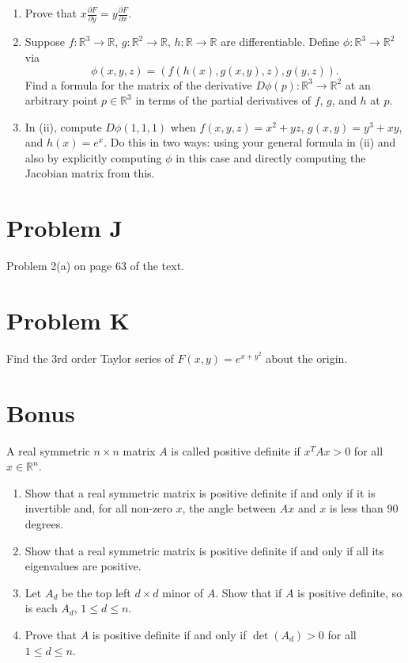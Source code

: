 \documentclass[lang=en,11pt]{template}
\begin{document}
\begin{enumerate}
    \item Prove that $x \frac{\partial F}{\partial y} = y \frac{\partial F}{\partial x}$.
    \item Suppose $f : \mathbb{R}^3 \to \mathbb{R}$, $g : \mathbb{R}^2 \to \mathbb{R}$, $h : \mathbb{R} \to \mathbb{R}$ are differentiable. Define $\phi : \mathbb{R}^3 \to \mathbb{R}^2$ via
    \[
    \phi(x, y, z) = (f(h(x), g(x, y), z), g(y, z)).
    \]
    Find a formula for the matrix of the derivative $D\phi(p) : \mathbb{R}^3 \to \mathbb{R}^2$ at an arbitrary point $p \in \mathbb{R}^3$ in terms of the partial derivatives of $f$, $g$, and $h$ at $p$.
    \item In (ii), compute $D\phi(1, 1, 1)$ when $f(x, y, z) = x^2 + yz$, $g(x, y) = y^3 + xy$, and $h(x) = e^x$. Do this in two ways: using your general formula in (ii) and also by explicitly computing $\phi$ in this case and directly computing the Jacobian matrix from this.
\end{enumerate}

\section*{Problem J}
Problem 2(a) on page 63 of the text.

\section*{Problem K}
Find the 3rd order Taylor series of $F(x, y) = e^{x + y^2}$ about the origin.

\section*{Bonus}
A real symmetric $n \times n$ matrix $A$ is called positive definite if $x^T A x > 0$ for all $x \in \mathbb{R}^n$.
\begin{enumerate}
    \item Show that a real symmetric matrix is positive definite if and only if it is invertible and, for all non-zero $x$, the angle between $Ax$ and $x$ is less than 90 degrees.
    \item Show that a real symmetric matrix is positive definite if and only if all its eigenvalues are positive.
    \item Let $A_d$ be the top left $d \times d$ minor of $A$. Show that if $A$ is positive definite, so is each $A_d$, $1 \leq d \leq n$.
    \item Prove that $A$ is positive definite if and only if $\det(A_d) > 0$ for all $1 \leq d \leq n$.
\end{enumerate}
\end{document}
